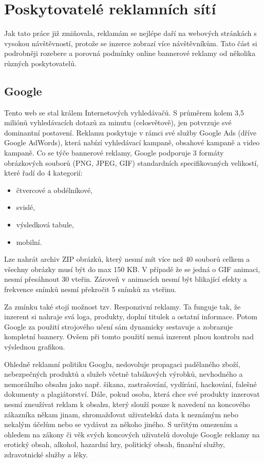 \section{Poskytovatelé reklamních sítí}
\label{sec:networks}
Jak tato práce již zmiňovala, reklamám se nejlépe daří na webových stránkách s vysokou návštěvností, protože se inzerce zobrazí více návštěvníkům.
Tato část si podrobněji rozebere a porovná podmínky online bannerové reklamy od několika různých poskytovatelů. 

    \subsection{Google}
    Tento web se stal králem Internetových vyhledávačů. S průměrem kolem 3,5 miliónů vyhledávacích dotazů za minutu (celosvětově),
    jen potvrzuje své dominantní postavení. Reklamu poskytuje v rámci své služby Google Ads (dříve Google AdWords),
    která nabízí vyhledávací kampaně, obsahové kampaně a video kampaně. Co se týče bannerové reklamy,
    Google podporuje 3 formáty obrázkových souborů (PNG, JPEG, GIF) standardních specifikovaných velikostí, které řadí do 4 kategorií:
    \begin{itemize}
        \item čtvercové a obdélníkové,
        \item svislé,
        \item výsledková tabule,
        \item mobilní.
    \end{itemize}

    Lze nahrát archiv ZIP obrázků, který nesmí mít více než 40 souborů celkem a všechny obrázky musí být do max 150 KB. V případě že se jedná o GIF animaci,
    nesmí přesáhnout 30 vteřin. Zároveň v animacích nesmí být blikající efekty a frekvence snímků nesmí překročit 5 snímků za vteřinu.

    Za zmínku také stojí možnost tzv. Responzivní reklamy. Ta funguje tak, že inzerent si nahraje svá loga, produkty,
    doplní titulek a ostatní informace. Potom Google za použití strojového učení sám dynamicky sestavuje a zobrazuje kompletní bannery.
    Ovšem při tomto použití nemá inzerent plnou kontrolu nad výslednou grafikou.

    Ohledně reklamní politiku Googlu, nedovoluje propagaci padělaného zboží, nebezpečných produktů a služeb včetně tabákových výrobků,
    nevhodného a nemorálního obsahu jako např. šikana, zastrašování, vydírání, hackování, falešné dokumenty a plagiátorství. Dále, pokud osoba,
    která chce své produkty inzerovat nesmí zneužívat reklam k obsahu, který slouží pouze k navedení na koncového zákazníka někam jinam,
    shromažďovat uživatelská data k neznámým nebo nekalým účelům nebo se vydávat za někoho jiného. S určitým omezením a ohledem na zákony či věk svých koncových
    uživatelů dovoluje Google reklamy na erotický obsah, alkohol, hazardní hry, politický obsah, finanční služby, zdravotnické služby a léky.

